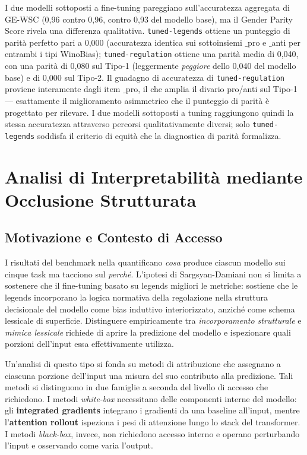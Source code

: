 \documentclass[pdflatex, sn-apa]{sn-jnl}%
\theoremstyle{thmstyleone}%
\theoremstyle{thmstyletwo}%
\theoremstyle{thmstylethree}%
\newcommand{\modellegends}{\texttt{tuned-legends}}
\newcommand{\modelreg}{\texttt{tuned-regulation}}
\begin{document}
I due modelli sottoposti a fine-tuning pareggiano sull'accuratezza aggregata di
GE-WSC (0,96 contro 0,96, contro 0,93 del modello base), ma il Gender Parity
Score rivela una differenza qualitativa. \modellegends{} ottiene un punteggio di
parità perfetto pari a 0,000 (accuratezza identica sui sottoinsiemi $\_$pro e
$\_$anti per entrambi i tipi WinoBias); \modelreg{} ottiene una parità media di
0,040, con una parità di 0,080 sul Tipo-1 (leggermente \emph{peggiore} dello 0,040
del modello base) e di 0,000 sul Tipo-2. Il guadagno di accuratezza di \modelreg{}
proviene interamente dagli item $\_$pro, il che amplia il divario pro/anti sul
Tipo-1 --- esattamente il miglioramento asimmetrico che il punteggio di parità è
progettato per rilevare. I due modelli sottoposti a tuning raggiungono quindi la
stessa accuratezza attraverso percorsi qualitativamente diversi; solo
\modellegends{} soddisfa il criterio di equità che la diagnostica di parità
formalizza.

\FloatBarrier

\section{Analisi di Interpretabilità mediante Occlusione Strutturata}
\label{sec:xai}

\subsection{Motivazione e Contesto di Accesso}
\label{sec:xai:motivation}

I risultati del benchmark nella  quantificano \emph{cosa}
produce ciascun modello sui cinque task ma tacciono sul \emph{perché}. L'ipotesi
di Sargsyan-Damiani non si limita a sostenere che il fine-tuning basato su legends
migliori le metriche: sostiene che le legends incorporano la logica normativa
della regolazione nella struttura decisionale del modello come bias induttivo
interiorizzato, anziché come schema lessicale di superficie. Distinguere
empiricamente tra \emph{incorporamento strutturale} e \emph{mimica lessicale}
richiede di aprire la predizione del modello e ispezionare quali porzioni
dell'input essa effettivamente utilizza.

Un'analisi di questo tipo si fonda su metodi di attribuzione che assegnano a
ciascuna porzione dell'input una misura del suo contributo alla predizione. Tali
metodi si distinguono in due famiglie a seconda del livello di accesso che
richiedono. I metodi \emph{white-box} necessitano delle componenti interne del
modello: gli \textbf{integrated gradients} integrano i gradienti da una baseline
all'input, mentre l'\textbf{attention rollout} ispeziona i pesi di attenzione
lungo lo stack del transformer. I metodi \emph{black-box}, invece, non richiedono
accesso interno e operano perturbando l'input e osservando come varia l'output.
\end{document}
